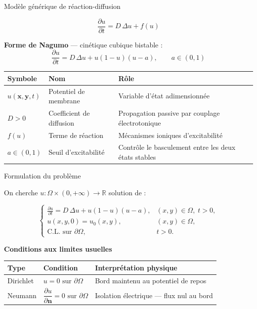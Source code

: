 \documentclass[10pt]{beamer}
\begin{document}
\begin{frame}{Modèle générique de réaction-diffusion}

\begin{equation}
  \frac{\partial u}{\partial t} = D\,\Delta u + f(u)
\end{equation}

\bigskip

\textbf{Forme de Nagumo} — cinétique cubique bistable :
\begin{equation}
  \frac{\partial u}{\partial t} = D\,\Delta u + u(1-u)(u-a), \qquad a \in (0,1)
\end{equation}

\bigskip

\begin{tabular}{@{}lll@{}}
  \toprule
  Symbole & Nom & Rôle \\
  \midrule
  $u(\mathbf{x,y},t)$ & Potentiel de membrane   & Variable d'état adimensionnée \\[4pt]
  $D > 0$           & Coefficient de diffusion & Propagation passive par couplage électrotonique \\[4pt]
  $f(u)$            & Terme de réaction        & Mécanismes ioniques d'excitabilité \\[4pt]
  $a \in (0,1)$     & Seuil d'excitabilité     & Contrôle le basculement entre les deux états stables \\
  \bottomrule
\end{tabular}

\end{frame}

\begin{frame}{Formulation du problème}

On cherche $u : \Omega \times (0,+\infty) \to \mathbb{R}$ solution de :

\begin{equation}
  \begin{cases}
    \displaystyle\frac{\partial u}{\partial t} = D\,\Delta u + u(1-u)(u-a),
    & (x,y) \in \Omega,\; t > 0, \\[10pt]
    u(x,y,0) = u_0(x,y),
    & (x,y) \in \Omega, \\[6pt]
    \text{C.L. sur } \partial\Omega,
    & t > 0.
  \end{cases}
\end{equation}

\bigskip

\textbf{Conditions aux limites usuelles}

\medskip

\begin{tabular}{@{}lll@{}}
  \toprule
  Type & Condition & Interprétation physique \\
  \midrule
  Dirichlet & $u = 0 \text{ sur } \partial\Omega$ & Bord maintenu au potentiel de repos \\[4pt]
  Neumann   & $\dfrac{\partial u}{\partial \mathbf{n}} = 0 \text{ sur } \partial\Omega$
            & Isolation électrique — flux nul au bord \\
  \bottomrule
\end{tabular}

\end{frame}
\end{document}
